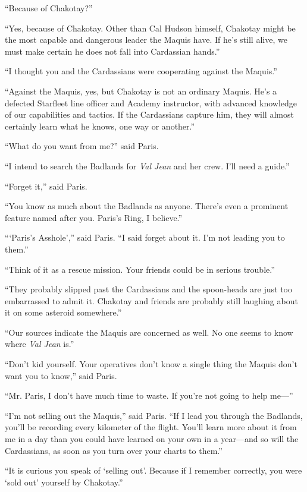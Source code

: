 \documentclass[twoside,letterpaper,12pt]{memoir}
\begin{document}
``Because of Chakotay?''

``Yes, because of Chakotay. Other than Cal Hudson himself, Chakotay might be the most capable and dangerous leader the Maquis have. If he's still alive, we must make certain he does not fall into Cardassian hands.''

``I thought you and the Cardassians were cooperating against the Maquis.''

``Against the Maquis, yes, but Chakotay is not an ordinary Maquis. He's a defected Starfleet line officer and Academy instructor, with advanced knowledge of our capabilities and tactics. If the Cardassians capture him, they will almost certainly learn what he knows, one way or another.''

``What do you want from me?'' said Paris.

``I intend to search the Badlands for \textit{Val Jean} and her crew. I'll need a guide.''

``Forget it,'' said Paris.

``You know as much about the Badlands as anyone. There's even a prominent feature named after you. Paris's Ring, I believe.''

```Paris's Asshole','' said Paris. ``I said forget about it. I'm not leading you to them.''

``Think of it as a rescue mission. Your friends could be in serious trouble.''

``They probably slipped past the Cardassians and the spoon-heads are just too embarrassed to admit it. Chakotay and friends are probably still laughing about it on some asteroid somewhere.''

``Our sources indicate the Maquis are concerned as well. No one seems to know where \textit{Val Jean} is.''

``Don't kid yourself. Your operatives don't know a single thing the Maquis don't want you to know,'' said Paris.

``Mr. Paris, I don't have much time to waste. If you're not going to help me---''

``I'm not selling out the Maquis,'' said Paris. ``If I lead you through the Badlands, you'll be recording every kilometer of the flight. You'll learn more about it from me in a day than you could have learned on your own in a year---and so will the Cardassians, as soon as you turn over your charts to them.''

``It is curious you speak of `selling out'. Because if I remember correctly, you were `sold out' yourself by Chakotay.''
\end{document}
